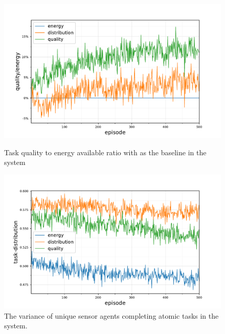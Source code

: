 \begin{figure}[ht]
	\begin{minipage}{.49\textwidth}
		\centering
		\includegraphics[width=1.0\linewidth,trim={25pt 0pt 50pt 0pt},clip]{5.19_ctv-quality-energy-baseline-comparison}
		\caption{Task quality to energy available ratio   with \newline \algorithmEnergy{}{} as the baseline in the \simulationExtended{}{} system}
		\label{fig:extended_quality_energy}
	\end{minipage}\hfill%
	\begin{minipage}{.49\textwidth}
	\centering
	\includegraphics[width=1.0\linewidth,trim={25pt 0pt 50pt 0pt},clip]{5.19_ctv-task-distribution-comparison}
	\caption{The variance of unique sensor agents completing \newline atomic tasks \newline in the \simulationExtended{}{} system.}
		\label{fig:extended_task_distribution}
\end{minipage}
\end{figure}

